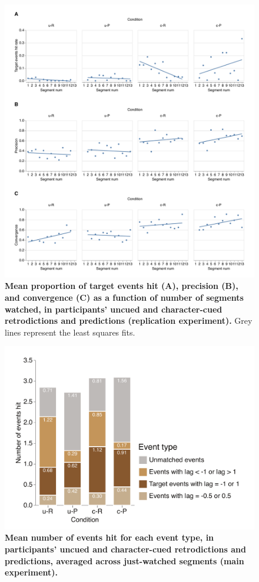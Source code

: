 \documentclass[10pt]{article}
\begin{document}
\begin{figure}[tp]
    \centering
    \includegraphics[width=\textwidth]{supp1_rep}
    \caption{\textbf{Mean proportion of target events hit (A), precision (B), and convergence (C) as a function of number of segments watched, in participants' uncued and character-cued retrodictions and predictions (replication experiment).} Grey lines represent the least squares fits.}
    \label{fig:supp1_rep}
\end{figure}

\begin{figure}[tp]
    \centering
    \includegraphics[width=\textwidth]{supp2}
    \caption{\textbf{Mean number of events hit for each event type, in participants' uncued and character-cued retrodictions and predictions, averaged across just-watched segments (main experiment).}}
    \label{fig:supp2}
\end{figure}
\end{document}
